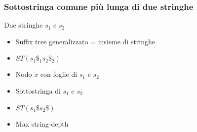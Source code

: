 \begin{frame}[fragile]
\frametitle{Sottostringa comune più lunga di due stringhe}
\begin{block}{Due stringhe $s_{1}$ e $s_{2}$}
\begin{itemize}[<+->]
\item
Suffix tree generalizzato = insieme di stringhe
\item
$ST(s_{1}\$_{1}s_{2}\$_{2})$
\item
Nodo $x$ con foglie di $s_{1}$ e $s_{2}$
\item
Sottostringa di $s_{1}$ e $s_{2}$
\item
$ST(s_{1}\$s_{2}\$)$
\item
Max string-depth
\end{itemize}
\end{block}
\end{frame}



